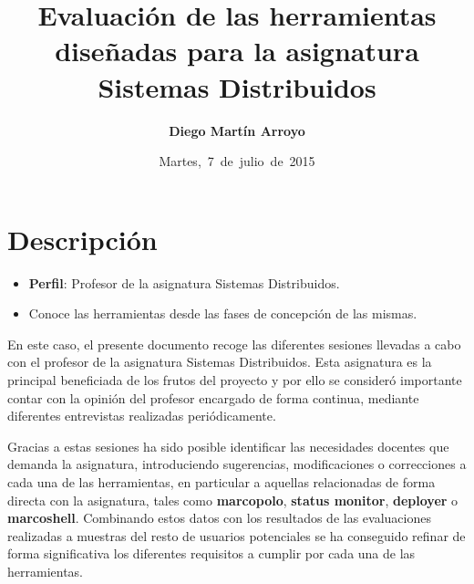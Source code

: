 
\usepackage{xcolor}

\newcommand{\hmwkTitle}{Evaluación de las herramientas diseñadas para la asignatura Sistemas Distribuidos} %
\newcommand{\hmwkDueDate}{Martes,\ 7\ de\ julio\ de\ 2015}
\newcommand{\hmwkClassInstructor}{Rodrigo Santamaría} %
\newcommand{\hmwkAuthorName}{Diego Martín Arroyo} %
\newcommand{\hmwkSubject}{8} %

\newcommand{\ordinalindicator}{\hspace{-1.5mm}$\phantom{a}^{\circ}$}
\title{\hmwkTitle}
\author{\textbf{\hmwkAuthorName}}
\date{\hmwkDueDate}


\maketitle



\section{Descripción}

\begin{itemize}
 	\item \textbf{Perfil}: Profesor de la asignatura Sistemas Distribuidos.
 	\item Conoce las herramientas desde las fases de concepción de las mismas.
\end{itemize}

En este caso, el presente documento recoge las diferentes sesiones llevadas a cabo con el profesor de la asignatura Sistemas Distribuidos. Esta asignatura es la principal beneficiada de los frutos del proyecto y por ello se consideró importante contar con la opinión del profesor encargado de forma continua, mediante diferentes entrevistas realizadas periódicamente.

Gracias a estas sesiones ha sido posible identificar las necesidades docentes que demanda la asignatura, introduciendo sugerencias, modificaciones o correcciones a cada una de las herramientas, en particular a aquellas relacionadas de forma directa con la asignatura, tales como \textbf{marcopolo}, \textbf{status monitor}, \textbf{deployer} o \textbf{marcoshell}. Combinando estos datos con los resultados de las evaluaciones realizadas a muestras del resto de usuarios potenciales se ha conseguido refinar de forma significativa los diferentes requisitos a cumplir por cada una de las herramientas.

